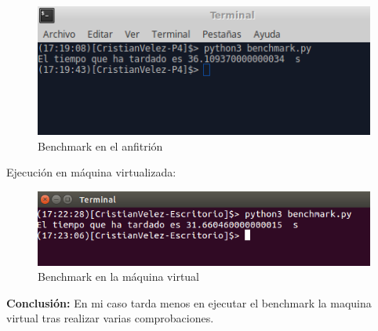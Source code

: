 \begin{figure}[H] %
	\centering
	\includegraphics[scale=0.4]{pics/anfitrion}  %
	\caption{Benchmark en el anfitrión} \label{fig:anfi}
\end{figure}


Ejecución en máquina virtualizada:

\begin{figure}[H] %
	\centering
	\includegraphics[scale=0.4]{pics/virtual}  %
	\caption{Benchmark en la máquina virtual} \label{fig:anfi}
\end{figure}

\textbf{Conclusión: }En mi caso tarda menos en ejecutar el benchmark la maquina virtual tras realizar varias comprobaciones.




\grid

